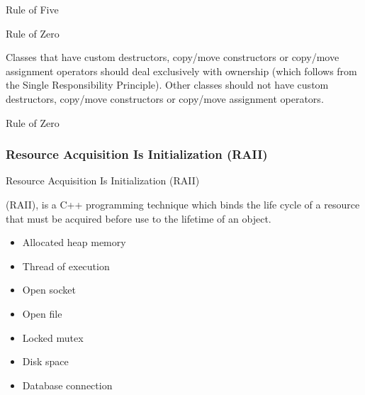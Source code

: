 \begin{frame}{Rule of Five}{}
  \begin{example}
  \end{example}
\end{frame}

\begin{frame}{Rule of Zero}{}
  \begin{definition}
    Classes that have custom destructors, copy/move constructors or copy/move assignment operators should deal exclusively with ownership (which follows from the Single Responsibility Principle). Other classes should not have custom destructors, copy/move constructors or copy/move assignment operators.
  \end{definition}
\end{frame}

\begin{frame}{Rule of Zero}{}
  \begin{example}
  \end{example}
\end{frame}

\subsubsection{Resource Acquisition Is Initialization (RAII)}

\begin{frame}{Resource Acquisition Is Initialization (RAII)}{}
  \begin{definition}
     (RAII), is a C++ programming technique which binds the life cycle of a resource that must be acquired before use to the lifetime of an object.
  \end{definition}

  \begin{examples}
    \begin{itemize}
    \item
       Allocated heap memory
    \item
       Thread of execution
    \item
       Open socket
    \item
       Open file
    \item
       Locked mutex
    \item
       Disk space
    \item
       Database connection
    \end{itemize}
  \end{examples}
\end{frame}

